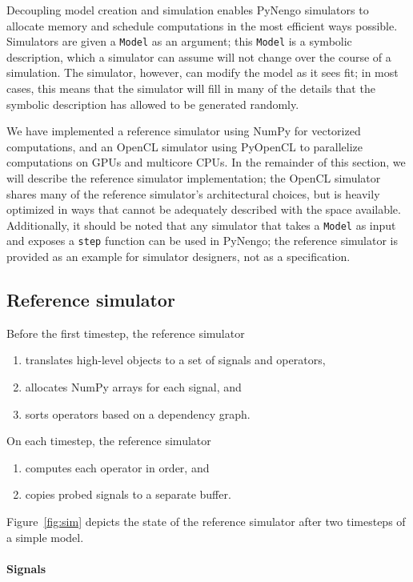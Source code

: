 \documentclass{frontiersSCNS}
\begin{document}
Decoupling model creation and simulation
enables PyNengo simulators
to allocate memory and schedule computations
in the most efficient ways possible.
Simulators are given a \texttt{Model}
as an argument;
this \texttt{Model} is a symbolic description,
which a simulator can assume will not change
over the course of a simulation.
The simulator, however,
can modify the model as it sees fit;
in most cases, this means that the simulator
will fill in many of the details
that the symbolic description
has allowed to be generated randomly.

We have implemented
a reference simulator using NumPy
for vectorized computations,
and an OpenCL simulator
using PyOpenCL to parallelize
computations on GPUs and multicore CPUs.
In the remainder of this section,
we will describe
the reference simulator implementation;
the OpenCL simulator shares many
of the reference simulator's architectural choices,
but is heavily optimized in ways
that cannot be adequately described
with the space available.
Additionally, it should be noted that
any simulator that takes a \texttt{Model}
as input and exposes a \texttt{step}
function can be used in PyNengo;
the reference simulator
is provided as an example
for simulator designers,
not as a specification.

\subsection{Reference simulator}

Before the first timestep, the reference simulator
\begin{enumerate}
  \item translates high-level objects to
    a set of signals and operators,
  \item allocates NumPy arrays for each signal, and
  \item sorts operators based on a dependency graph.
\end{enumerate}
On each timestep, the reference simulator
\begin{enumerate}
  \item computes each operator in order, and
  \item copies probed signals to a separate buffer.
\end{enumerate}
Figure~\ref{fig:sim} depicts
the state of the reference simulator
after two timesteps of a simple model.

\paragraph{Signals}
\end{document}
